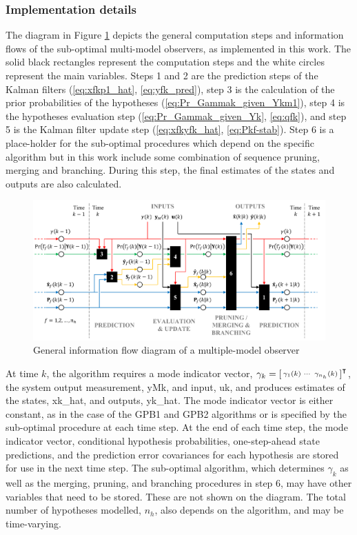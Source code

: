 \subsubsection{Implementation details} \label{sec:implementation}

The diagram in Figure \ref{fig:mkf-infoflow} depicts the general computation steps and information flows of the sub-optimal multi-model observers, as implemented in this work. The solid black rectangles represent the computation steps and the white circles represent the main variables. Steps 1 and 2 are the prediction steps of the Kalman filters (\ref{eq:xfkp1_hat}, \ref{eq:yfk_pred}), step 3 is the calculation of the prior probabilities of the hypotheses (\ref{eq:Pr_Gammak_given_Ykm1}), step 4 is the hypotheses evaluation step (\ref{eq:Pr_Gammak_given_Yk}, \ref{eq:qfk}), and step 5 is the Kalman filter update step (\ref{eq:xfkyfk_hat}, \ref{eq:Pkf-stab}). Step 6 is a place-holder for the sub-optimal procedures which depend on the specific algorithm but in this work include some combination of sequence pruning, merging and branching. During this step, the final estimates of the states and outputs are also calculated.

\begin{figure}[ht]
	\centering
	\includegraphics[width=15.5cm]{images/mkf_infoflow.pdf}
	\caption{General information flow diagram of a multiple-model observer}
	\label{fig:mkf-infoflow}
\end{figure}

At time $k$, the algorithm requires a mode indicator vector, $\gamma_k=\begin{bsmallmatrix} \gamma_1(k) & \cdots & \gamma_{n_h}(k) \end{bsmallmatrix}^\intercal$, the system output measurement, \gls{yMk}, and input, \gls{uk}, and produces estimates of the states, \gls{xk_hat}, and outputs, \gls{yk_hat}. The mode indicator vector is either constant, as in the case of the \gls{GPB1} and \gls{GPB2} algorithms or is specified by the sub-optimal procedure at each time step. At the end of each time step, the mode indicator vector, conditional hypothesis probabilities, one-step-ahead state predictions, and the prediction error covariances for each hypothesis are stored for use in the next time step. The sub-optimal algorithm, which determines $\gamma_k$ as well as the merging, pruning, and branching procedures in step 6, may have other variables that need to be stored. These are not shown on the diagram. The total number of hypotheses modelled, $n_h$, also depends on the algorithm, and may be time-varying.

